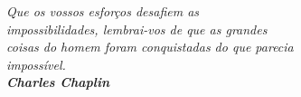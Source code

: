 \begin{epigrafe}[]
    \vspace*{\fill}
	\begin{flushright}
	
		\textit{Que os vossos esforços desafiem as\\ impossibilidades, lembrai-vos de que as grandes\\ coisas do homem foram conquistadas do que parecia\\ impossível.\\
				\textbf{Charles Chaplin}}
		
	\end{flushright}
\end{epigrafe}
